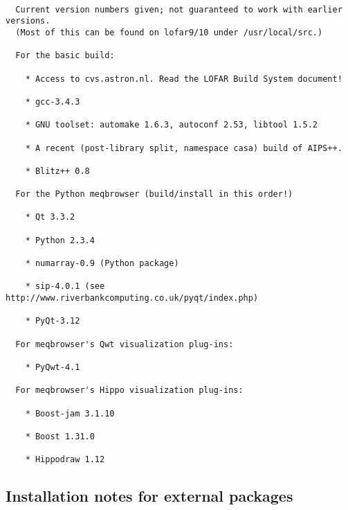 \documentclass[10pt]{article}
\begin{document}
\begin{verbatim}

  Current version numbers given; not guaranteed to work with earlier versions.
  (Most of this can be found on lofar9/10 under /usr/local/src.)

  For the basic build:

    * Access to cvs.astron.nl. Read the LOFAR Build System document!

    * gcc-3.4.3

    * GNU toolset: automake 1.6.3, autoconf 2.53, libtool 1.5.2

    * A recent (post-library split, namespace casa) build of AIPS++.

    * Blitz++ 0.8

  For the Python meqbrowser (build/install in this order!)

    * Qt 3.3.2

    * Python 2.3.4

    * numarray-0.9 (Python package)

    * sip-4.0.1 (see http://www.riverbankcomputing.co.uk/pyqt/index.php)

    * PyQt-3.12

  For meqbrowser's Qwt visualization plug-ins:
  
    * PyQwt-4.1

  For meqbrowser's Hippo visualization plug-ins:

    * Boost-jam 3.1.10

    * Boost 1.31.0

    * Hippodraw 1.12
\end{verbatim}
  
\subsection{Installation notes for external packages}
  
\end{document}
